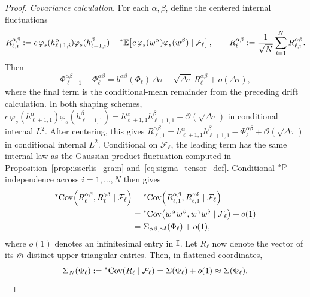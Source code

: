 \begin{proof}
\medskip\noindent\emph{Covariance calculation.}
For each $\alpha, \beta$, define the centered internal fluctuations
\begin{equation}\label{eq:shaped_R_def}
R_{\ell,i}^{\alpha\beta} := c\,\varphi_s(h_{\ell+1,i}^\alpha)\varphi_s(h_{\ell+1,i}^\beta) - {}^*\mathbb{E}\!\left[c\,\varphi_s(w^\alpha)\varphi_s(w^\beta) \mid \mathcal{F}_\ell\right], \qquad R_\ell^{\alpha\beta} := \frac{1}{\sqrt{N}}\sum_{i=1}^N R_{\ell,i}^{\alpha\beta}.
\end{equation}
Then
\begin{equation}\label{eq:shaped_inc_entry}
\Phi_{\ell+1}^{\alpha\beta} - \Phi_\ell^{\alpha\beta} = b^{\alpha\beta}(\Phi_\ell)\,\Delta\tau + \sqrt{\Delta\tau}\,R_\ell^{\alpha\beta} + o(\Delta\tau),
\end{equation}
where the final term is the conditional-mean remainder from the preceding drift calculation. In both shaping schemes, $c\,\varphi_s(h_{\ell+1,1}^\alpha)\varphi_s(h_{\ell+1,1}^\beta) = h_{\ell+1,1}^\alpha h_{\ell+1,1}^\beta + \mathcal{O}(\sqrt{\Delta\tau})$ in conditional internal $L^2$. After centering, this gives $R_{\ell,1}^{\alpha\beta} = h_{\ell+1,1}^\alpha h_{\ell+1,1}^\beta - \Phi_\ell^{\alpha\beta} + \mathcal{O}(\sqrt{\Delta\tau})$ in conditional internal $L^2$. Conditional on $\mathcal{F}_\ell$, the leading term has the same internal law as the Gaussian-product fluctuation computed in Proposition~\ref{prop:isserlis_gram} and~\eqref{eq:sigma_tensor_def}. Conditional ${}^*\mathbb{P}$-independence across $i = 1, \dots, N$ then gives
\begin{equation}\label{eq:shaped_cov_approx}
\begin{aligned}
{}^*\!\operatorname{Cov}\!\left(R_\ell^{\alpha\beta}, R_\ell^{\gamma\delta} \mid \mathcal{F}_\ell\right) &= {}^*\!\operatorname{Cov}\!\left(R_{\ell,1}^{\alpha\beta}, R_{\ell,1}^{\gamma\delta} \mid \mathcal{F}_\ell\right) \\
&= {}^*\!\operatorname{Cov}\!\left(w^\alpha w^\beta, w^\gamma w^\delta \mid \mathcal{F}_\ell\right) + o(1) \\
&= \Sigma_{\alpha\beta,\gamma\delta}(\Phi_\ell) + o(1),
\end{aligned}
\end{equation}
where $o(1)$ denotes an infinitesimal entry in $\mathbb{I}$. Let $R_\ell$ now denote the vector of its $\bar{m}$ distinct upper-triangular entries. Then, in flattened coordinates,
\begin{equation}\label{eq:sigma_N_approx}
\Sigma_N(\Phi_\ell) := {}^*\!\operatorname{Cov}(R_\ell \mid \mathcal{F}_\ell) = \Sigma(\Phi_\ell) + o(1) \approx \Sigma(\Phi_\ell).
\end{equation}

\end{proof}
